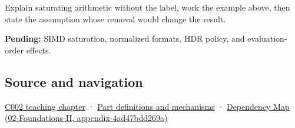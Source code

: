 Explain saturating arithmetic without the label, work the example above, then state the assumption whose removal would change the result.

\textbf{Pending:} SIMD saturation, normalized formats, HDR policy, and evaluation-order effects.

\subsection{Source and navigation}\label{source-and-navigation}

\href{Continuous\%20Notes/Computing\%20Foundations\%20-\%20From\%20Bits\%20to\%20C++\%20and\%20Systems\%20APIs\#Arithmetic\%20becomes\%20a\%20policy}{C002 teaching chapter} · \hyperref[appendix-fd090d982a15]{Part definitions and mechanisms} · \href{}{Dependency Map (02-Foundations-II, appendix-4ad47bdd269a)}
